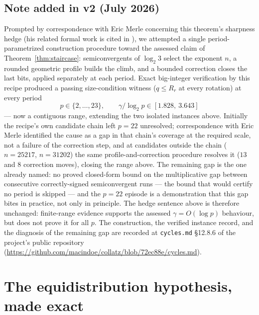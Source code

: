 \documentclass[11pt]{article}
\theoremstyle{remark}
\newcommand{\LL}{\log_2 3}
\begin{document}
\subsection*{Note added in v2 (July 2026)}
Prompted by correspondence with Eric Merle concerning this theorem's sharpness hedge (his related formal work is cited in \cite{merle}), we attempted a single period-parametrized construction procedure toward the assessed claim of Theorem~\ref{thm:staircase}: semiconvergents of $\LL$ select the exponent $n$, a rounded geometric profile builds the climb, and a bounded correction closes the last bits, applied separately at each period. Exact big-integer verification by this recipe produced a passing size-condition witness ($q \le R_r$ at every rotation) at every period
\[ p \in \{2,\dots,23\}, \qquad \gamma/\log_2 p \in [1.828,\ 3.643] \]
--- now a contiguous range, extending the two isolated instances above. Initially the recipe's own candidate chain left $p = 22$ unresolved; correspondence with Eric Merle identified the cause as a gap in that chain's coverage at the required scale, not a failure of the correction step, and at candidates outside the chain ($n = 25217$, $n = 31202$) the same profile-and-correction procedure resolves it ($13$ and $8$ correction moves), closing the range above. The remaining gap is the one already named: no proved closed-form bound on the multiplicative gap between consecutive correctly-signed semiconvergent runs --- the bound that would certify no period is skipped --- and the $p = 22$ episode is a demonstration that this gap bites in practice, not only in principle. The hedge sentence above is therefore unchanged: finite-range evidence supports the assessed $\gamma = O(\log p)$ behaviour, but does not prove it for all $p$. The construction, the verified instance record, and the diagnosis of the remaining gap are recorded at \texttt{cycles.md} \S12.8.6 of the project's public repository (\url{https://github.com/macindoe/collatz/blob/72ec88e/cycles.md}).

\section{The equidistribution hypothesis, made exact}\label{sec:aeh}
\end{document}
